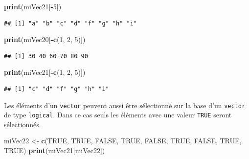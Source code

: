 \documentclass[]{book}
\newenvironment{Shaded}{\begin{snugshade}}{\end{snugshade}}
\newcommand{\KeywordTok}[1]{\textcolor[rgb]{0.13,0.29,0.53}{\textbf{#1}}}
\newcommand{\DecValTok}[1]{\textcolor[rgb]{0.00,0.00,0.81}{#1}}
\newcommand{\StringTok}[1]{\textcolor[rgb]{0.31,0.60,0.02}{#1}}
\newcommand{\OtherTok}[1]{\textcolor[rgb]{0.56,0.35,0.01}{#1}}
\newcommand{\OperatorTok}[1]{\textcolor[rgb]{0.81,0.36,0.00}{\textbf{#1}}}
\newcommand{\NormalTok}[1]{#1}
\begin{document}
\begin{Shaded}
\begin{Highlighting}[]
\KeywordTok{print}\NormalTok{(miVec21[}\OperatorTok{-}\DecValTok{5}\NormalTok{])}
\end{Highlighting}
\end{Shaded}

\begin{verbatim}
## [1] "a" "b" "c" "d" "f" "g" "h" "i"
\end{verbatim}

\begin{Shaded}
\begin{Highlighting}[]
\KeywordTok{print}\NormalTok{(miVec20[}\OperatorTok{-}\KeywordTok{c}\NormalTok{(}\DecValTok{1}\NormalTok{, }\DecValTok{2}\NormalTok{, }\DecValTok{5}\NormalTok{)])}
\end{Highlighting}
\end{Shaded}

\begin{verbatim}
## [1] 30 40 60 70 80 90
\end{verbatim}

\begin{Shaded}
\begin{Highlighting}[]
\KeywordTok{print}\NormalTok{(miVec21[}\OperatorTok{-}\KeywordTok{c}\NormalTok{(}\DecValTok{1}\NormalTok{, }\DecValTok{2}\NormalTok{, }\DecValTok{5}\NormalTok{)])}
\end{Highlighting}
\end{Shaded}

\begin{verbatim}
## [1] "c" "d" "f" "g" "h" "i"
\end{verbatim}

Les éléments d'un \texttt{vector} peuvent aussi être sélectionné sur la
base d'un \texttt{vector} de type \texttt{logical}. Dans ce cas seuls
les éléments avec une valeur \texttt{TRUE} seront sélectionnés.

\begin{Shaded}
\begin{Highlighting}[]
\NormalTok{miVec22 <-}\StringTok{ }\KeywordTok{c}\NormalTok{(}\OtherTok{TRUE}\NormalTok{, }\OtherTok{TRUE}\NormalTok{, }\OtherTok{FALSE}\NormalTok{, }\OtherTok{TRUE}\NormalTok{, }\OtherTok{FALSE}\NormalTok{, }\OtherTok{TRUE}\NormalTok{, }\OtherTok{FALSE}\NormalTok{, }\OtherTok{TRUE}\NormalTok{, }\OtherTok{TRUE}\NormalTok{)}
\KeywordTok{print}\NormalTok{(miVec21[miVec22])}
\end{Highlighting}
\end{Shaded}
\end{document}
